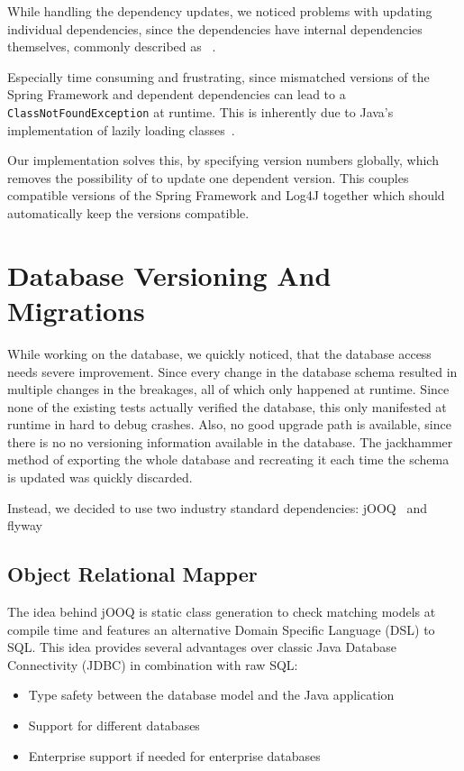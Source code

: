 While handling the dependency updates, we noticed problems with updating individual dependencies, since the dependencies
have internal dependencies themselves, commonly described as ~\cite{jang2006linux}.

Especially time consuming and frustrating, since mismatched versions of the Spring Framework and dependent dependencies
can lead to a \lstinline{ClassNotFoundException} at runtime.
This is inherently due to Java's implementation of lazily loading classes~\cite{gosling2014java}.

Our implementation solves this, by specifying version numbers globally, which removes the possibility of 
to update one dependent version.
This couples compatible versions of the Spring Framework and Log4J together which should automatically keep the versions
compatible.

\section{Database Versioning And Migrations}\label{sec:databaseVersioningAndMigrations}
While working on the database, we quickly noticed, that the database access needs severe improvement.
Since every change in the database schema resulted in multiple changes in the breakages, all of which only happened at
runtime.
Since none of the existing tests actually verified the database, this only manifested at runtime in hard to debug
crashes.
Also, no good upgrade path is available, since there is no no versioning information available in the database.
The jackhammer method of exporting the whole database and recreating it each time the schema is updated was quickly
discarded.

Instead, we decided to use two industry standard dependencies: jOOQ~\cite{jooq} and flyway~\cite{flyway}

\subsection*{Object Relational Mapper}
The idea behind jOOQ is static class generation to check matching models at compile time and features an alternative
Domain Specific Language (DSL) to SQL\@.
This idea provides several advantages over classic Java Database Connectivity (JDBC) in combination with raw SQL:
\begin{itemize}
\item Type safety between the database model and the Java application
\item Support for different databases
\item Enterprise support if needed for enterprise databases
\end{itemize}

